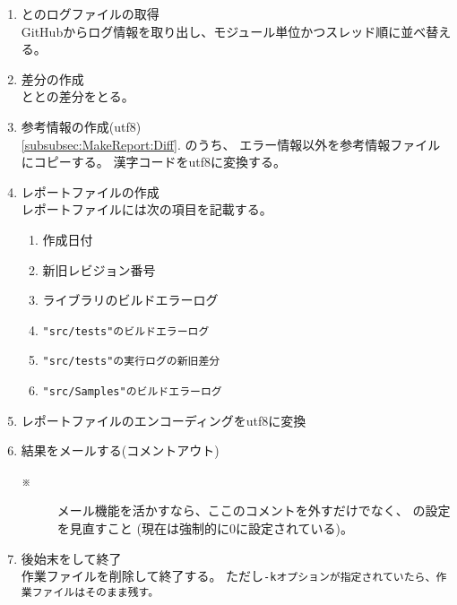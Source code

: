 \begin{Proc}[b]
\begin{enumerate}
  \item	{}とのログファイルの取得\\
	GitHubからログ情報を取り出し、モジュール単位かつスレッド順に並べ替える。\\

  \item	\label{subsubsec:MakeReport:Diff}
	差分の作成\\
	ととの差分をとる。\\

  \item	参考情報の作成(utf8)\\
	\ref{subsubsec:MakeReport:Diff}. のうち、
	エラー情報以外を参考情報ファイルにコピーする。
        漢字コードをutf8に変換する。

  \item	レポートファイルの作成\\
	レポートファイルには次の項目を記載する。
	\begin{narrow}[\WID]
		\begin{enumerate}
		  \item	作成日付
		  \item	新旧レビジョン番号
		  \item	ライブラリのビルドエラーログ
		  \item	\tt{"src/tests"}のビルドエラーログ
		  \item	\tt{"src/tests"}の実行ログの新旧差分
		  \item	\tt{"src/Samples"}のビルドエラーログ
		\end{enumerate}
	\end{narrow}

  \item	レポートファイルのエンコーディングをutf8に変換

  \item	結果をメールする(コメントアウト)
	\begin{description}
	  \item[※] メール機能を活かすなら、ここのコメントを外すだけでなく、
		    の設定を見直すこと
		    (現在は強制的に0に設定されている)。
	\end{description}

  \item	後始末をして終了\\
	作業ファイルを削除して終了する。
	ただし\tt{-k}オプションが指定されていたら、作業ファイルはそのまま残す。

\end{enumerate}
\end{Proc}
